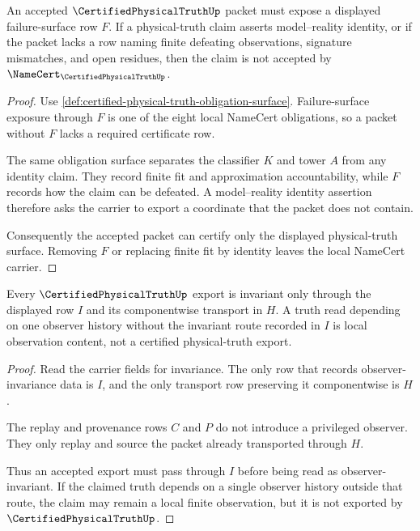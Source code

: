 \begin{theorem}
\label{thm:certified-physical-truth-failure-surface}
An accepted $\CertifiedPhysicalTruthUp$ packet must expose a displayed failure-surface row $F$. If a physical-truth claim asserts model--reality identity, or if the packet lacks a row naming finite defeating observations, signature mismatches, and open residues, then the claim is not accepted by $\NameCert_{\CertifiedPhysicalTruthUp}$.
\end{theorem}
\begin{proof}
Use \autoref{def:certified-physical-truth-obligation-surface}. Failure-surface exposure through $F$ is one of the eight local NameCert obligations, so a packet without $F$ lacks a required certificate row.

The same obligation surface separates the classifier $K$ and tower $A$ from any identity claim. They record finite fit and approximation accountability, while $F$ records how the claim can be defeated. A model--reality identity assertion therefore asks the carrier to export a coordinate that the packet does not contain.

Consequently the accepted packet can certify only the displayed physical-truth surface. Removing $F$ or replacing finite fit by identity leaves the local NameCert carrier.
\end{proof}

\begin{theorem}
\label{thm:certified-physical-truth-observer-invariance}
Every $\CertifiedPhysicalTruthUp$ export is invariant only through the displayed row $I$ and its componentwise transport in $H$. A truth read depending on one observer history without the invariant route recorded in $I$ is local observation content, not a certified physical-truth export.
\end{theorem}
\begin{proof}
Read the carrier fields for invariance. The only row that records observer-invariance data is $I$, and the only transport row preserving it componentwise is $H$.

The replay and provenance rows $C$ and $P$ do not introduce a privileged observer. They only replay and source the packet already transported through $H$.

Thus an accepted export must pass through $I$ before being read as observer-invariant. If the claimed truth depends on a single observer history outside that route, the claim may remain a local finite observation, but it is not exported by $\CertifiedPhysicalTruthUp$.
\end{proof}

